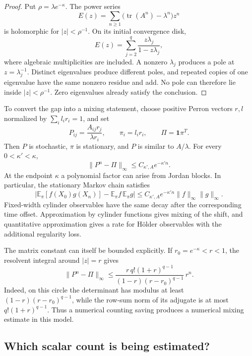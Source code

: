 \documentclass[11pt,a4paper]{article}
\numberwithin{equation}{section}
\theoremstyle{definition}
\theoremstyle{remark}
\DeclareMathOperator{\tr}{tr}
\begin{document}
\begin{proof}
Put $\rho=\lambda e^{-\kappa}$. The power series
\[
 E(z)=\sum_{n\geq1}\bigl(\tr(A^n)-\lambda^n\bigr)z^n
\]
is holomorphic for $|z|<\rho^{-1}$. On its initial convergence disk,
\[
 E(z)=\sum_{j=2}^q\frac{z\lambda_j}{1-z\lambda_j},
\]
where algebraic multiplicities are included. A nonzero $\lambda_j$
produces a pole at $z=\lambda_j^{-1}$. Distinct eigenvalues produce
different poles, and repeated copies of one eigenvalue have the same
nonzero residue and add. No pole can therefore lie inside
$|z|<\rho^{-1}$. Zero eigenvalues already satisfy the conclusion.
\end{proof}

To convert the gap into a mixing statement, choose positive Perron
vectors $r,l$ normalized by $\sum_i l_ir_i=1$, and set
\[
 P_{ij}=\frac{A_{ij}r_j}{\lambda r_i},
 \qquad \pi_i=l_ir_i,\qquad \Pi=\mathbf1\pi^T.
\]
Then $P$ is stochastic, $\pi$ is stationary, and $P$ is similar to
$A/\lambda$. For every $0<\kappa'<\kappa$,
\begin{equation}
 \|P^n-\Pi\|_\infty\leq C_{\kappa',A}e^{-\kappa'n}.
 \label{eq:countmixparry}
\end{equation}
At the endpoint $\kappa$ a polynomial factor can arise from Jordan
blocks. In particular, the stationary Markov chain satisfies
\[
 \left|\mathbb E_\pi[f(X_0)g(X_n)]
       -\mathbb E_\pi f\,\mathbb E_\pi g\right|
 \leq C_{\kappa',A}e^{-\kappa'n}\|f\|_\infty\|g\|_\infty.
\]
Fixed-width cylinder observables have the same decay after the
corresponding time offset. Approximation by cylinder functions gives
mixing of the shift, and quantitative approximation gives a rate for
H\"older observables with the additional regularity loss.

The matrix constant can itself be bounded explicitly. If
$r_0=e^{-\kappa}<r<1$, the resolvent integral around $|z|=r$ gives
\begin{equation}
 \|P^n-\Pi\|_\infty
 \leq
 \frac{r\,q!(1+r)^{q-1}}
      {(1-r)(r-r_0)^{q-1}}\,r^n.
 \label{eq:countmixmatrixconstant}
\end{equation}
Indeed, on this circle the determinant has modulus at least
$(1-r)(r-r_0)^{q-1}$, while the row-sum norm of its adjugate is
at most $q!(1+r)^{q-1}$. Thus a numerical counting saving produces
a numerical mixing estimate in this model.

\subsection{Which scalar count is being estimated?}
\label{subsec:countmixscalar}
\end{document}
